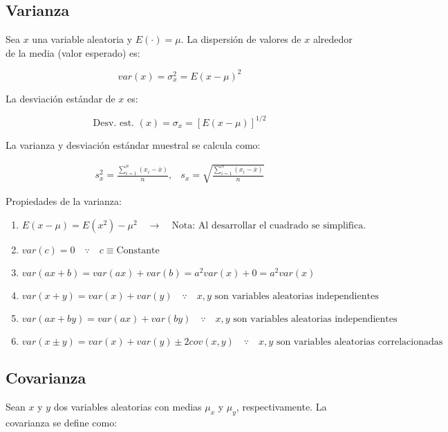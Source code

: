 \documentclass[
]{book}
\providecommand{\tightlist}{%
  \setlength{\itemsep}{0pt}\setlength{\parskip}{0pt}}
\begin{document}
\hypertarget{varianza}{%
\subsection{Varianza}\label{varianza}}

Sea \(x\) una variable aleatoria y \(E(\cdot) = \mu\). La dispersión de valores de \(x\) alrededor de la media (valor esperado) es:

\[
var(x) = \sigma_x^2 = E(x-\mu)^2
\]

La desviación estándar de \(x\) es:

\[
\text{Desv. est. }(x) = \sigma_x = [E(x-\mu)]^{1/2}
\]

La varianza y desviación estándar muestral se calcula como:

\[
\begin{array}{cc}
s_x^2 = \frac{\sum_{i=1}^n (x_i - \bar x)}{n}, & s_x = \sqrt{\frac{\sum_{i=1}^n (x_i - \bar x)}{n}}
\end{array}
\]

Propiedades de la varianza:

\begin{enumerate}
\def\labelenumi{\arabic{enumi}.}
\tightlist
\item
  \(E(x-\mu) = E(x^2) - \mu^2 \quad \rightarrow \quad \text{Nota: Al desarrollar el cuadrado se simplifica.}\)
\item
  \(var(c)=0 \quad \because \quad c \equiv \text{Constante}\)
\item
  \(var(ax + b) = var(ax) + var(b) = a^2 var(x) + 0 = a^2 var(x)\)
\item
  \(var(x+y) = var(x) + var(y) \quad \because \quad x,y \text{ son variables aleatorias independientes}\)
\item
  \(var(ax + by) = var(ax) + var(by) \quad \because \quad x,y \text{ son variables aleatorias independientes}\)
\item
  \(var(x \pm y) = var(x) + var(y) \pm 2cov(x,y) \quad \because \quad x,y \text{ son variables aleatorias correlacionadas}\)
\end{enumerate}

\hypertarget{covarianza}{%
\subsection{Covarianza}\label{covarianza}}

Sean \(x\) y \(y\) dos variables aleatorias con medias \(\mu_x\) y \(\mu_y\), respectivamente. La covarianza se define como:
\end{document}
